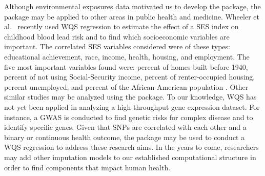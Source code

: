 Although environmental exposures data motivated us to develop the
 package, the package may be applied to other areas in public
health and medicine. Wheeler et
al.~\citep{wheelerExplainingVariationElevated2019} recently used WQS
regression to estimate the effect of a SES index on childhood blood lead
risk and to find which socioeconomic variables are important. The
correlated SES variables considered were of these types: educational
achievement, race, income, health, housing, and employment. The five
most important variables found were: percent of homes built before 1940,
percent of not using Social-Security income, percent of renter-occupied
housing, percent unemployed, and percent of the African American
population \citep[pg.974]{wheelerExplainingVariationElevated2019}. Other
similar studies may be analyzed using the  package. To our
knowledge, WQS has not yet been applied in analyzing a high-throughput
gene expression dataset. For instance, a GWAS is conducted to find
genetic risks for complex disease and to identify specific genes. Given
that SNPs are correlated with each other
\citep{ferberModelingDiscreteSurvival2015} and a binary or continuous
health outcome, the  package may be used to conduct a WQS
regression to address these research aims. In the years to come,
researchers may add other imputation models to our established
computational structure in order to find components that impact human
health.


